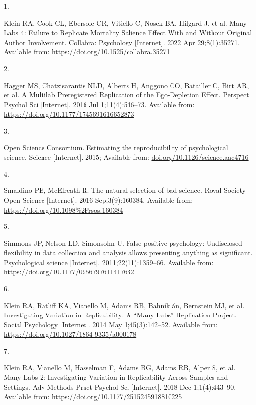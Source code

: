 \documentclass[
  english,
  a4paper,
]{article}
\newlength{\cslhangindent}
\newlength{\csllabelwidth}
\newenvironment{CSLReferences}[2] %
{\begin{list}{}{%
			\setlength{\itemindent}{0pt}
			\setlength{\leftmargin}{0pt}
			\setlength{\parsep}{0pt}
			\ifodd #1
			\setlength{\leftmargin}{\cslhangindent}
			\setlength{\itemindent}{-1\cslhangindent}
			\fi
			\setlength{\itemsep}{#2\baselineskip}}}
	{\end{list}}
\newcommand{\CSLLeftMargin}[1]{\parbox[t]{\csllabelwidth}{\strut#1\strut}}
\newcommand{\CSLRightInline}[1]{\parbox[t]{\linewidth - \csllabelwidth}{\strut#1\strut}}
\begin{document}
\protect{}\label{refs}
\begin{CSLReferences}{0}{1}
\CSLLeftMargin{1. }%
\CSLRightInline{Klein RA, Cook CL, Ebersole CR, Vitiello C, Nosek BA, Hilgard J, et al. Many {Labs} 4: {Failure} to {Replicate Mortality Salience Effect With} and {Without Original Author Involvement}. Collabra: Psychology {[}Internet{]}. 2022 Apr 29;8(1):35271. Available from: \url{https://doi.org/10.1525/collabra.35271}}

\CSLLeftMargin{2. }%
\CSLRightInline{Hagger MS, Chatzisarantis NLD, Alberts H, Anggono CO, Batailler C, Birt AR, et al. A {Multilab Preregistered Replication} of the {Ego-Depletion Effect}. Perspect Psychol Sci {[}Internet{]}. 2016 Jul 1;11(4):546--73. Available from: \url{https://doi.org/10.1177/1745691616652873}}

\CSLLeftMargin{3. }%
\CSLRightInline{Open Science Consortium. Estimating the reproducibility of psychological science. Science {[}Internet{]}. 2015; Available from: \href{https://doi.org/10.1126/science.aac4716}{doi.org/10.1126/science.aac4716}}

\CSLLeftMargin{4. }%
\CSLRightInline{Smaldino PE, McElreath R. The natural selection of bad science. Royal Society Open Science {[}Internet{]}. 2016 Sep;3(9):160384. Available from: \url{https://doi.org/10.1098\%2Frsos.160384}}

\CSLLeftMargin{5. }%
\CSLRightInline{Simmons JP, Nelson LD, Simonsohn U. False-positive psychology: Undisclosed flexibility in data collection and analysis allows presenting anything as significant. Psychological science {[}Internet{]}. 2011;22(11):1359--66. Available from: \url{https://doi.org/10.1177/0956797611417632}}

\CSLLeftMargin{6. }%
\CSLRightInline{Klein RA, Ratliff KA, Vianello M, Adams RB, Bahník án, Bernstein MJ, et al. Investigating {Variation} in {Replicability}: {A} {``{Many Labs}''} {Replication Project}. Social Psychology {[}Internet{]}. 2014 May 1;45(3):142--52. Available from: \url{https://doi.org/10.1027/1864-9335/a000178}}

\CSLLeftMargin{7. }%
\CSLRightInline{Klein RA, Vianello M, Hasselman F, Adams BG, Adams RB, Alper S, et al. Many {Labs} 2: {Investigating Variation} in {Replicability Across Samples} and {Settings}. Adv Methods Pract Psychol Sci {[}Internet{]}. 2018 Dec 1;1(4):443--90. Available from: \url{https://doi.org/10.1177/2515245918810225}}


\end{CSLReferences}
\end{document}
